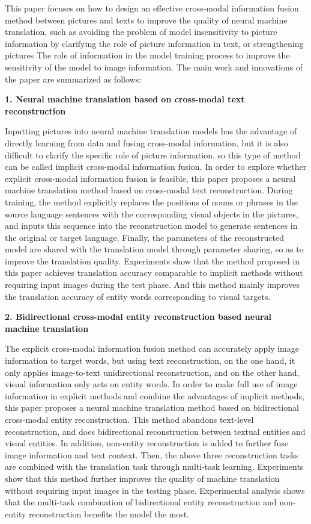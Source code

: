 This paper focuses on how to design an effective cross-modal information fusion method between pictures and texts to improve the quality of neural machine translation, such as avoiding the problem of model insensitivity to picture information by clarifying the role of picture information in text, or strengthening pictures The role of information in the model training process to improve the sensitivity of the model to image information. The main work and innovations of the paper are summarized as follows:

\textbf{1. Neural machine translation based on cross-modal text reconstruction}

Inputting pictures into neural machine translation models has the advantage of directly learning from data and fusing cross-modal information, but it is also difficult to clarify the specific role of picture information, so this type of method can be called implicit cross-modal information fusion. In order to explore whether explicit cross-modal information fusion is feasible, this paper proposes a neural machine translation method based on cross-modal text reconstruction. During training, the method explicitly replaces the positions of nouns or phrases in the source language sentences with the corresponding visual objects in the pictures, and inputs this sequence into the reconstruction model to generate sentences in the original or target language. Finally, the parameters of the reconstructed model are shared with the translation model through parameter sharing, so as to improve the translation quality. Experiments show that the method proposed in this paper achieves translation accuracy comparable to implicit methods without requiring input images during the test phase. And this method mainly improves the translation accuracy of entity words corresponding to visual targets.

\textbf{2. Bidirectional cross-modal entity reconstruction based neural machine translation}

The explicit cross-modal information fusion method can accurately apply image information to target words, but using text reconstruction, on the one hand, it only applies image-to-text unidirectional reconstruction, and on the other hand, visual information only acts on entity words. In order to make full use of image information in explicit methods and combine the advantages of implicit methods, this paper proposes a neural machine translation method based on bidirectional cross-modal entity reconstruction. This method abandons text-level reconstruction, and does bidirectional reconstruction between textual entities and visual entities. In addition, non-entity reconstruction is added to further fuse image information and text context. Then, the above three reconstruction tasks are combined with the translation task through multi-task learning. Experiments show that this method further improves the quality of machine translation without requiring input images in the testing phase. Experimental analysis shows that the multi-task combination of bidirectional entity reconstruction and non-entity reconstruction benefits the model the most.

